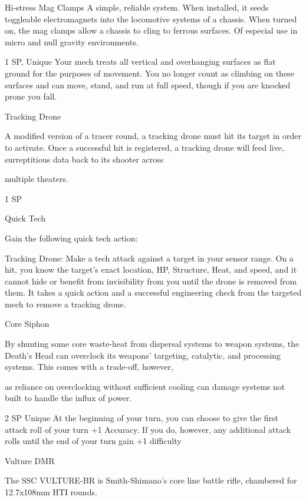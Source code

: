 Hi-stress Mag Clamps  
A simple, reliable system. When installed, it seeds toggleable electromagnets into the locomotive systems  
of a chassis. When turned on, the mag clamps allow a chassis to cling to ferrous surfaces. Of especial use  
in micro and null gravity environments.  

1 SP, Unique  
Your mech treats all vertical and overhanging surfaces as flat ground for the purposes of  
movement. You no longer count as climbing on these surfaces and can move, stand, and run at  
full speed, though if you are knocked prone you fall.
 

Tracking Drone  

A modified version of a tracer round, a tracking drone must hit its target in order to activate. Once a  
successful hit is registered, a tracking drone will feed live, surreptitious data back to its shooter across  

multiple theaters.   

1 SP
 
Quick Tech
 
Gain the following quick tech action:
 
	        Tracking Drone: Make a tech attack against a target in your sensor range. On a hit, you  
know the target’s exact location, HP, Structure, Heat, and speed, and it cannot hide or benefit  
from invisibility from you until the drone is removed from them. It takes a quick action and a  
successful engineering check from the targeted mech to remove a tracking drone.
 

Core Siphon  

By shunting some core waste-heat from dispersal systems to weapon systems, the Death’s Head can  
overclock its weapons’ targeting, catalytic, and processing systems. This comes with a trade-off, however,  

as reliance on overclocking without sufficient cooling can damage systems not built to handle the influx of  
power.   

                                                                                                                        


2 SP  
Unique  
At the beginning of your turn, you can choose to give the first attack roll of your turn +1  
Accuracy. If you do, however, any additional attack rolls until the end of your turn gain +1  
difficulty
 

Vulture DMR  

The SSC VULTURE-BR is Smith-Shimano’s core line battle rifle, chambered for 12.7x108mm HTI rounds.  

